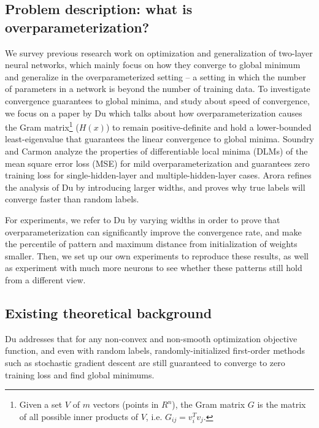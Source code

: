 \documentclass{article}
\begin{document}
\subsection{Problem description: what is overparameterization?}
We survey previous research work on optimization and generalization of two-layer neural networks, which mainly focus on how they converge to global minimum and generalize in the overparameterized setting -- a setting in which the number of parameters in a network is beyond the number of training data. To investigate convergence guarantees to global minima, and study about speed of convergence, we focus on a paper by Du \cite{SimonDu} which talks about how overparameterization causes the Gram matrix\footnote{Given a set $V$ of $m$ vectors (points in $R^n$), the Gram matrix $G$ is the matrix of all possible inner products of $V$, i.e. $G_{i j}=v_i^T v_j$.}  ($H(x)$) to remain positive-definite and hold a lower-bounded least-eigenvalue that guarantees the linear convergence to global minima. Soundry and Carmon \cite{SoudryCarmon} analyze the properties of differentiable local minima (DLMs) of the mean square error loss (MSE) for mild overparameterization and guarantees zero training loss for single-hidden-layer and multiple-hidden-layer cases. Arora \cite{Arora} refines the analysis of Du \cite{SimonDu} by introducing larger widths, and proves why true labels will converge faster than random labels. 

For experiments, we refer to Du \cite{SimonDu} by varying widths in order to prove that overparameterization can significantly improve the convergence rate, and make the percentile of pattern and maximum distance from initialization of weights smaller. Then, we set up our own experiments to reproduce these results, as well as experiment with much more neurons to see whether these patterns still hold from a different view. 

\subsection{Existing theoretical background}
Du \cite{SimonDu} addresses that for any non-convex and non-smooth optimization objective function, and even with random labels, randomly-initialized first-order methods such as stochastic gradient descent are still guaranteed to converge to zero training loss and find global minimums.\\
\end{document}
